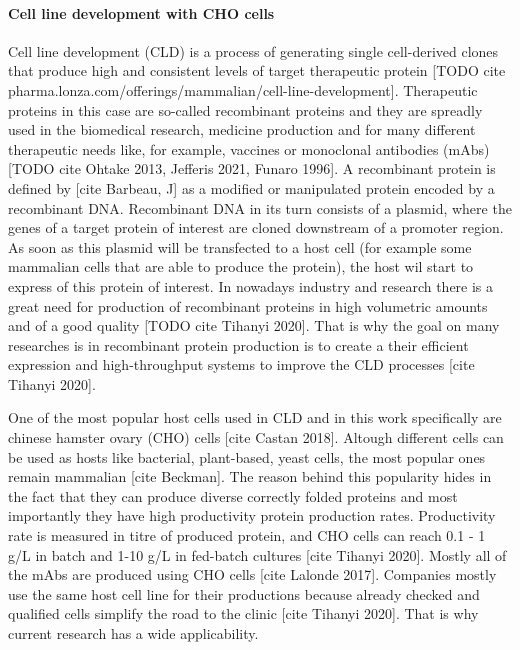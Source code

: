 \paragraph{Cell line development with CHO cells}
Cell line development (CLD) is a process of generating single cell-derived clones that produce high and consistent levels of target therapeutic protein [TODO cite pharma.lonza.com/offerings/mammalian/cell-line-development]. Therapeutic proteins in this case are so-called recombinant proteins and they are spreadly used in the biomedical research, medicine production and for many different therapeutic needs like, for example, vaccines or monoclonal antibodies (mAbs) [TODO cite Ohtake 2013, Jefferis 2021, Funaro 1996]. A recombinant protein is defined by [cite Barbeau, J] as a modified or manipulated protein encoded by a recombinant DNA. Recombinant DNA in its turn consists of a plasmid, where the genes of a target protein of interest are cloned downstream of a promoter region. As soon as this plasmid will be transfected to a host cell (for example some mammalian cells that are able to produce the protein), the host wil start to express of this protein of interest. In nowadays industry and research there is a great need for production of recombinant proteins in high volumetric amounts and of a good quality [TODO cite Tihanyi 2020]. That is why the goal on many researches is in recombinant protein production is to create a their efficient expression and high-throughput systems to improve the CLD processes [cite Tihanyi 2020].


One of the most popular host cells used in CLD and in this work specifically are chinese hamster ovary (CHO) cells [cite Castan 2018]. Altough different cells can be used as hosts like bacterial, plant-based, yeast cells, the most popular ones remain mammalian [cite Beckman]. The reason behind this popularity hides in the fact that they can produce diverse correctly folded proteins and most importantly they have high productivity protein production rates. Productivity rate is measured in titre of produced protein, and CHO cells can reach 0.1 - 1 g/L in batch and 1-10 g/L in fed-batch cultures [cite Tihanyi 2020]. Mostly all of the mAbs are produced using CHO cells [cite Lalonde 2017]. Companies mostly use the same host cell line for their productions because already checked and qualified cells simplify the road to the clinic [cite Tihanyi 2020]. That is why current research has a wide applicability.

